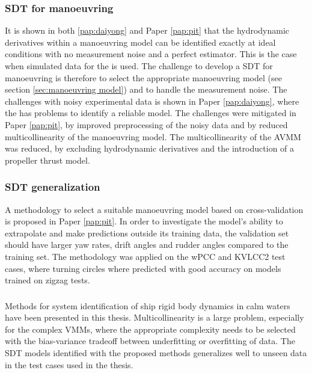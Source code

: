 \subsubsection*{SDT for manoeuvring}
It is shown in both \ref{pap:daiyong} and Paper \ref{pap:pit} that the hydrodynamic derivatives within a manoeuvring model can be identified exactly at ideal conditions with no measurement noise and a perfect estimator. This is the case when simulated data for the  is used.
The challenge to develop a SDT for manoeuvring is therefore to select the appropriate manoeuvring model (see section \ref{sec:manoeuvring model}) and to handle the measurement noise.
The challenges with noisy experimental data is shown in Paper \ref{pap:daiyong}, where the  has problems to identify a reliable model. The challenges were mitigated in Paper \ref{pap:pit}, by improved preprocessing of the noisy data and by reduced multicollinearity of the manoeuvring model. The multicollinearity of the AVMM was reduced, by excluding hydrodynamic derivatives and the introduction of a propeller thrust model.

\subsubsection*{SDT generalization}
A methodology to select a suitable manoeuvring model based on cross-validation is proposed in Paper \ref{pap:pit}. In order to investigate the model's ability to extrapolate and make predictions outside its training data, the validation set should have larger yaw rates, drift angles and rudder angles compared to the training set. The methodology was applied on the wPCC and KVLCC2 test cases, where turning circles where predicted with good accuracy on models trained on zigzag tests. 

\subsubsection*{}
Methods for system identification of ship rigid body dynamics in calm waters have been presented in this thesis. Multicollinearity is a large problem, especially for the complex VMMs, where the appropriate complexity needs to be selected with the bias-variance tradeoff between underfitting or overfitting of data. The SDT models identified with the proposed methods generalizes well to unseen data in the test cases used in the thesis.